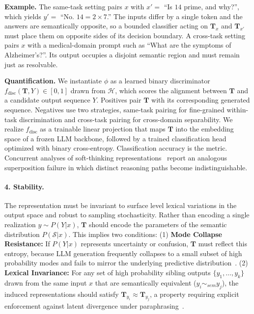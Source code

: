 \textbf{Example.} The same-task setting pairs $x$ with
$x' =$ ``Is $14$ prime, and why?'', which yields $y' =$ ``No. $14 = 2 \times 7$.''
The inputs differ by a single token and the answers are semantically opposite,
so a bounded classifier acting on $\mathbf{T}_x$ and $\mathbf{T}_{x'}$ must
place them on opposite sides of its decision boundary. A cross-task setting
pairs $x$ with a medical-domain prompt such as
``What are the symptoms of Alzheimer's?''. Its output occupies a disjoint
semantic region and must remain just as resolvable.

\textbf{Quantification.} We instantiate $\phi$ as a learned binary discriminator $f_{\text{disc}}(\mathbf{T}, Y) \in [0,1]$ drawn from $\mathcal{H}$, which scores the alignment between $\mathbf{T}$ and a candidate output sequence $Y$. Positives pair $\mathbf{T}$ with its corresponding generated sequence. Negatives use two strategies, same-task pairing for fine-grained within-task discrimination and cross-task pairing for cross-domain separability. We realize $f_{\text{disc}}$ as a trainable linear projection that maps $\mathbf{T}$ into the embedding space of a frozen LLM backbone, followed by a trained classification head optimized with binary cross-entropy. Classification accuracy is the metric. Concurrent analyses of soft-thinking representations~\citep{rizvi-martel2026the} report an analogous superposition failure in which distinct reasoning paths become indistinguishable.

\paragraph{4. Stability.}
The representation must be invariant to surface level lexical variations in the output space and robust to sampling stochasticity. Rather than encoding a single realization $y \sim P(Y|x)$, $\mathbf{T}$ should encode the parameters of the semantic distribution $P(\mathcal{S}|x)$. This implies two conditions: (1) \textbf{Mode Collapse Resistance:} If $P(Y|x)$ represents uncertainty or confusion, $\mathbf{T}$ must reflect this entropy, because LLM generation frequently collapses to a small subset of high probability modes and fails to mirror the underlying predictive distribution~\citep{zhu2026exploring}. (2) \textbf{Lexical Invariance:} For any set of high probability sibling outputs $\{y_1, \dots, y_k\}$ drawn from the same input $x$ that are semantically equivalent ($y_i \sim_{sem} y_j$), the induced representations should satisfy $\mathbf{T}_{y_i} \approx \mathbf{T}_{y_j}$, a property requiring explicit enforcement against latent divergence under paraphrasing~\citep{prasanth2026enforcing}.

